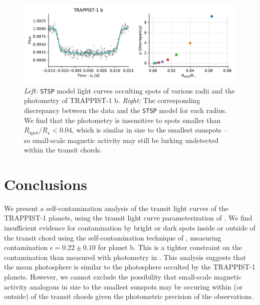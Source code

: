 \begin{figure}
    \centering
    \includegraphics[scale=0.8]{trappist1_robin/spots.pdf}
    \caption{{\it Left:} \texttt{STSP} model light curves occulting spots of various radii and the \spitzer photometry of TRAPPIST-1 b. {\it Right:} The corresponding discrepancy between the data and the \texttt{STSP} model for each radius. We find that the photometry is insensitive to spots smaller than $R_\mathrm{spot}/R_\star < 0.04$, which is similar in size to the smallest sunspots -- so small-scale magnetic activity may still be lurking undetected within the transit chords.}
    \label{fig:stsp}
\end{figure}

\section{Conclusions}

We present a self-contamination analysis of the \spitzer transit light curves of the TRAPPIST-1 planets, using the transit light curve parameterization of \citet{Morris2018f}. We find insufficient evidence for contamination by bright or dark spots inside or outside of the transit chord using the self-contamination technique of \citet{Morris2018f}, measuring contamination $\epsilon = 0.22 \pm 0.10$ for planet b. This is a tighter constraint on the contamination than measured with \kepler photometry in \citet{Morris2018f}. This analysis suggests that the mean photosphere is similar to the photosphere occulted by the TRAPPIST-1 planets. However, we cannot exclude the possibility that small-scale magnetic activity analogous in size to the smallest sunspots may be occuring within (or outside) of the transit chords given the photometric precision of the \spitzer observations.   

